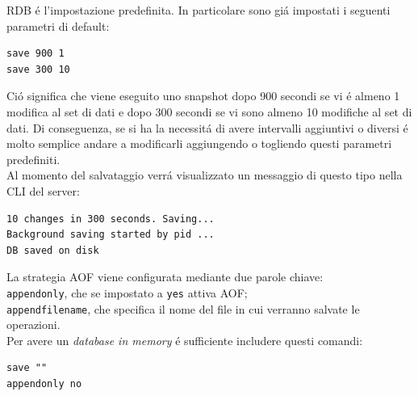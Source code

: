 RDB é l'impostazione predefinita. In particolare sono giá impostati i seguenti parametri di default:
\begin{lstlisting}[autogobble]
save 900 1
save 300 10\end{lstlisting}
Ció significa che viene eseguito uno snapshot dopo 900 secondi se vi é almeno 1 modifica al set di dati e dopo
300 secondi se vi sono almeno 10 modifiche al set di dati.
Di conseguenza, se si ha la necessitá di avere intervalli aggiuntivi o diversi é molto semplice andare a modificarli aggiungendo o togliendo questi parametri predefiniti.\\

Al momento del salvataggio verrá visualizzato un messaggio di questo tipo nella CLI del server:
\begin{lstlisting}[autogobble]
10 changes in 300 seconds. Saving...
Background saving started by pid ...
DB saved on disk\end{lstlisting}


La strategia AOF viene configurata mediante due parole chiave:\\
\texttt{appendonly}, che se impostato a \texttt{yes} attiva AOF;\\
\texttt{appendfilename}, che specifica il nome del file in cui verranno salvate le operazioni.\\

Per avere un \emph{database in memory} é sufficiente includere questi comandi:
\begin{lstlisting}[autogobble]
save ""
appendonly no\end{lstlisting}


